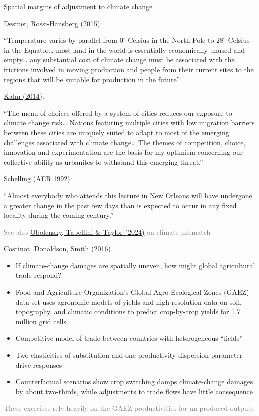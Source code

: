 \documentclass[11pt,notes=hide,aspectratio=169]{beamer}
\begin{document}
\begin{frame}{Spatial margins of adjustment to climate change}
{\footnotesize
\href{https://crossmark.crossref.org/dialog/?doi=10.1016/j.jue.2015.04.004}{Desmet, Rossi-Hansberg (2015)}:\\
{``Temperature varies by parallel from $0^{\circ}$ Celsius in the North Pole to $28^{\circ}$ Celsius in the Equator\dots
most land in the world is essentially economically unused and empty\dots
any substantial cost of climate change must be associated with the frictions involved in moving production and people from their current sites to the regions that will be suitable for production in the future''
\par}
\vspace{2mm}
\href{http://www.nber.org/papers/w20716}{Kahn (2014)}:\\
{``The menu of choices offered by a system of cities reduces our exposure to climate change risk\dots
Nations featuring multiple cities with low migration barriers between these cities are uniquely suited to adapt to most of the emerging challenges associated with climate change\dots
The themes of competition, choice, innovation and experimentation are the basis for my optimism concerning our collective ability as urbanites to withstand this emerging threat.''
\par}
\vspace{2mm}
\href{https://www.jstor.org/stable/2117599}{Schelling (AER 1992)}:\\
{``Almost everybody who attends this lecture in New Orleans will have undergone a greater change in the past few days than is expected to occur in any fixed locality during the coming century.''
\par}
}
\textcolor{gray}{\scriptsize See also \href{https://www.nber.org/papers/w32035}{Obolensky, Tabellini \& Taylor (2024)} on climate mismatch}
\end{frame}
\begin{frame}{Costinot, Donaldson, Smith (2016)}
\begin{itemize}
\item
If climate-change damages are spatially uneven, how might global agricultural trade respond?
\item
Food and Agriculture Organization's Global Agro-Ecological Zones (GAEZ) data set uses agronomic models of yields and high-resolution data on soil, topography, and climatic conditions to predict crop-by-crop yields for 1.7 million grid cells.
\item
Competitive model of trade between countries with heterogeneous ``fields''
\item 
Two elasticities of substitution and one productivity dispersion parameter drive responses
\item
Counterfactual scenarios show crop switching damps climate-change damages by about two-thirds, while adjustments to trade flows have little consequence
\end{itemize}
\textcolor{gray}{These exercises rely heavily on the GAEZ productivities for un-produced outputs}
\end{frame}
\end{document}
